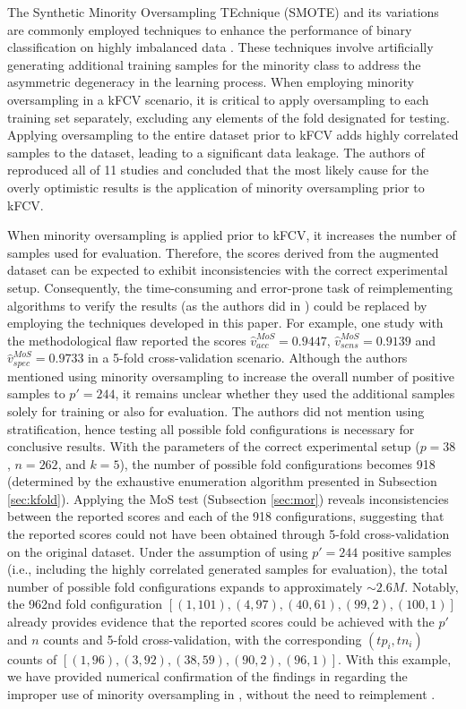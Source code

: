 \documentclass[3p, times]{elsarticle}
\begin{document}
The Synthetic Minority Oversampling TEchnique (SMOTE) \cite{smote} and its variations are commonly employed techniques to enhance the performance of binary classification on highly imbalanced data \cite{add2}. These techniques involve artificially generating additional training samples for the minority class to address the asymmetric degeneracy in the learning process. When employing minority oversampling in a kFCV scenario, it is critical to apply oversampling to each training set separately, excluding any elements of the fold designated for testing. Applying oversampling to the entire dataset prior to kFCV adds highly correlated samples to the dataset, leading to a significant data leakage. The authors of \cite{ehg} reproduced all of 11 studies and concluded that the most likely cause for the overly optimistic results is the application of minority oversampling prior to kFCV.

When minority oversampling is applied prior to kFCV, it increases the number of samples used for evaluation. Therefore, the scores derived from the augmented dataset can be expected to exhibit inconsistencies with the correct experimental setup. Consequently, the time-consuming and error-prone task of reimplementing algorithms to verify the results (as the authors did in \cite{ehg}) could be replaced by employing the techniques developed in this paper. For example, one study with the methodological flaw \cite{ehgflaw2} reported the scores $\hat{v}_{acc}^{MoS} = 0.9447$, $\hat{v}_{sens}^{MoS} = 0.9139$ and $\hat{v}_{spec}^{MoS} = 0.9733$ in a 5-fold cross-validation scenario. Although the authors mentioned using minority oversampling to increase the overall number of positive samples to $p'=244$, it remains unclear whether they used the additional samples solely for training or also for evaluation.
The authors did not mention using stratification, hence testing all possible fold configurations is necessary for conclusive results. 
With the parameters of the correct experimental setup ($p=38$, $n=262$, and $k=5$), the number of possible fold configurations becomes 918 (determined by the exhaustive enumeration algorithm presented in Subsection \ref{sec:kfold}).
Applying the MoS test (Subsection \ref{sec:mor}) reveals inconsistencies between the reported scores and each of the 918 configurations, suggesting that the reported scores could not have been obtained through 5-fold cross-validation on the original dataset.
Under the assumption of using $p'=244$ positive samples (i.e., including the highly correlated generated samples for evaluation), the total number of possible fold configurations expands to approximately $\sim2.6M$. Notably, the 962nd fold configuration $[(1, 101), (4, 97), (40, 61), (99, 2), (100, 1)]$ already provides evidence that the reported scores could be achieved with the $p'$ and $n$ counts and 5-fold cross-validation, with the corresponding $(tp_i, tn_i)$ counts of $[(1, 96), (3, 92), (38, 59), (90, 2), (96, 1)]$. With this example, we have provided numerical confirmation of the findings in \cite{ehg} regarding the improper use of minority oversampling in \cite{ehgflaw2}, without the need to reimplement \cite{ehgflaw2}.
\end{document}
